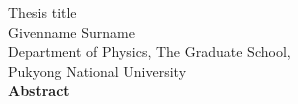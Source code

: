 



\begin{center}
{\fontsize{10}{10}\selectfont
Thesis title\\[1cm]}
{\fontsize{10}{10}\selectfont
Givenname Surname\\[1cm]
Department of Physics, The Graduate School,\\[0.1cm]
Pukyong National University\\[1cm]
}
{\fontsize{12}{12}\selectfont
\textbf{Abstract}\\}
\end{center}
\vspace{-0.5cm}
